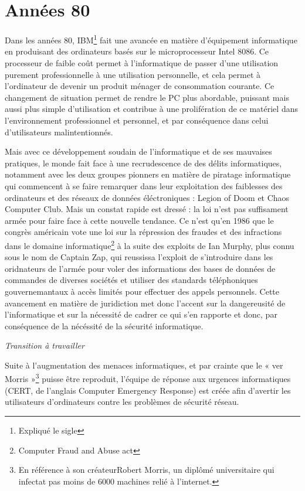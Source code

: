 \documentclass[a4paper]{memoir}
\begin{document}
\section{Années 80}

Dans les années 80, IBM\footnote{Expliqué le sigle} fait une avancée en matière d'équipement informatique en produisant des ordinateurs basés sur le microprocesseur Intel 8086. Ce processeur de faible coût permet à l'informatique de passer d'une utilisation purement professionnelle à une utilisation personnelle, et cela permet à l'ordinateur de devenir un produit ménager de consommation courante. Ce changement de situation permet de rendre le PC plus abordable, puissant mais aussi plus simple d'utilisation et contribue à une prolifération de ce matériel dans l'environnement professionnel et personnel, et par conséquence dans celui d'utilisateurs malintentionnés.

Mais avec ce développement soudain de l'informatique et de ses mauvaises pratiques, le monde fait face à une recrudescence de des délits informatiques, notamment avec les deux groupes pionners en matière de piratage informatique qui commencent à se faire remarquer dans leur exploitation des faiblesses des ordinateurs et des réseaux de données éléctroniques : Legion of Doom et Chaos Computer Club. Mais un constat rapide est dressé : la loi n'est pas suffisament armée pour faire face à cette nouvelle tendance. Ce n'est qu'en 1986 que le congrès américain vote une loi sur la répression des fraudes et des infractions dans le domaine informatique\footnote{Computer Fraud and Abuse act} à la suite des exploits de Ian Murphy, plus connu sous le nom de Captain Zap, qui reussissa l'exploit de s'introduire dans les oridnateurs de l'armée pour voler des informations des bases de données de commandes de diverses sociétés et utiliser des standards téléphoniques gouvernemantaux à accès limités pour effectuer des appels personnels. 
Cette avancement en matière de juridiction met donc l'accent sur la dangereusité de l'informatique et sur la nécessité de cadrer ce qui s'en rapporte et donc, par conséquence de la nécéssité de la sécurité informatique.

\textit{Transition à travailler}

Suite à l'augmentation des menaces informatiques, et par crainte que le « ver Morris »\footnote{En référence à son créateurRobert Morris, un diplômé universitaire qui infectat pas moins de 6000 machines relié à l'internet.} puisse être reproduit, l'équipe de réponse aux urgences informatiques (CERT, de l'anglais Computer Emergency Response) est créée afin d'avertir les utilisateurs d'ordinateurs contre les problèmes de sécurité réseau.
\end{document}
